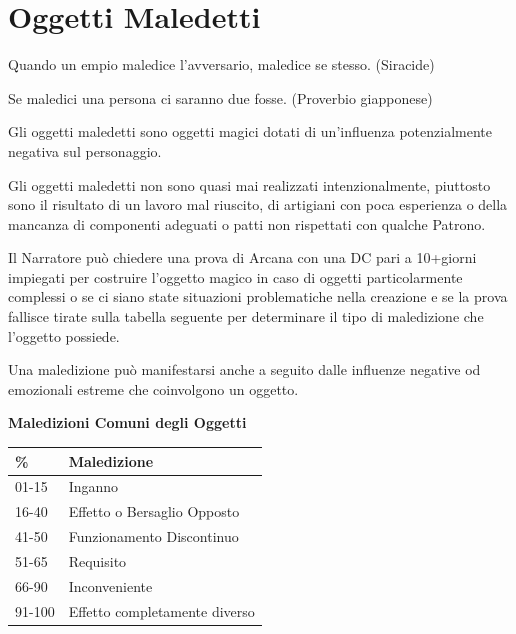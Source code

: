 \section{Oggetti Maledetti}

\begin{changemargin}{0.3cm}{0.3cm}\begin{enfasi}{Quando un empio maledice l'avversario, maledice se stesso. (Siracide)

\medskip

Se maledici una persona ci saranno due fosse. (Proverbio giapponese)}
\end{enfasi}\end{changemargin}\medskip

\begin{multicols}{2}

\label{oggetti-maledetti}

Gli oggetti maledetti sono oggetti magici dotati di un'influenza potenzialmente negativa sul personaggio.

Gli oggetti maledetti non sono quasi mai realizzati intenzionalmente, piuttosto sono il risultato di un lavoro mal riuscito, di artigiani con poca esperienza o della mancanza di componenti adeguati o patti non rispettati con qualche Patrono.

Il Narratore può chiedere una prova di Arcana con una DC pari a 10+giorni impiegati per costruire l'oggetto magico in caso di oggetti particolarmente complessi o se ci siano state situazioni problematiche nella creazione e se la prova fallisce tirate sulla tabella seguente per determinare il tipo di maledizione che l'oggetto possiede.

Una maledizione può manifestarsi anche a seguito dalle influenze negative od emozionali estreme che coinvolgono un oggetto.

\medskip

\textbf{Maledizioni Comuni degli Oggetti}

\medskip

\begin{tabular}{ll}
\textbf{\%} & \textbf{Maledizione}\\
\toprule
01-15 & Inganno\\
16-40 & Effetto o Bersaglio Opposto\\
41-50 & Funzionamento Discontinuo\\
51-65 & Requisito\\
66-90 & Inconveniente\\
91-100& Effetto completamente diverso
\end{tabular}


\end{multicols}
